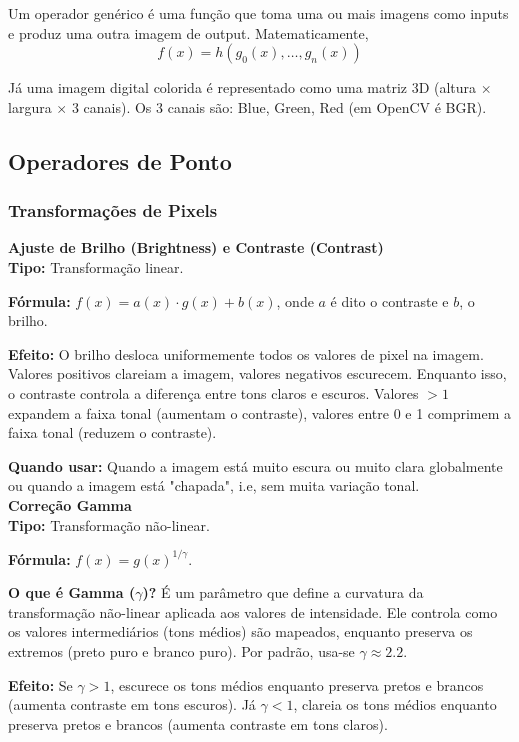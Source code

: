 \documentclass[12pt, a4paper]{article}
\begin{document}
Um operador genérico é uma função que toma uma ou mais imagens como inputs e produz uma outra imagem de output. Matematicamente,
\[
f(x) = h(g_0(x), \dots, g_n(x))
\]

Já uma imagem digital colorida é representado como uma matriz 3D (altura $\times$ largura $\times$ 3 canais). Os 3 canais são: Blue, Green, Red (em OpenCV é BGR).

\subsection{Operadores de Ponto}

\subsubsection{Transformações de Pixels}

\noindent\textbf{Ajuste de Brilho (Brightness) e Contraste (Contrast)} \\

\noindent\textbf{Tipo:} Transformação linear.

\noindent\textbf{Fórmula:} $ f(x) = a(x) \cdot g(x) + b(x) $, onde $a$ é dito o contraste e $b$, o brilho.

\noindent\textbf{Efeito:} O brilho desloca uniformemente todos os valores de pixel na imagem. Valores positivos clareiam a imagem, valores negativos escurecem. Enquanto isso, o contraste controla a diferença entre tons claros e escuros. Valores $> 1$ expandem a faixa tonal (aumentam o contraste), valores entre 0 e 1 comprimem a faixa tonal (reduzem o contraste).

\noindent\textbf{Quando usar:} Quando a imagem está muito escura ou muito clara globalmente ou quando a imagem está "chapada", i.e, sem muita variação tonal. \\

\noindent\textbf{Correção Gamma} \\

\noindent\textbf{Tipo:} Transformação não-linear.

\noindent\textbf{Fórmula:} $f(x) = g(x)^{1/\gamma}$.

\noindent\textbf{O que é Gamma ($\gamma$)?} É um parâmetro que define a curvatura da transformação não-linear aplicada aos valores de intensidade. Ele controla como os valores intermediários (tons médios) são mapeados, enquanto preserva os extremos (preto puro e branco puro). Por padrão, usa-se $\gamma \approx 2.2$.

\noindent\textbf{Efeito:} Se $\gamma > 1$, escurece os tons médios enquanto preserva pretos e brancos (aumenta contraste em tons escuros). Já $\gamma < 1$, clareia os tons médios enquanto preserva pretos e brancos (aumenta contraste em tons claros).
\end{document}
